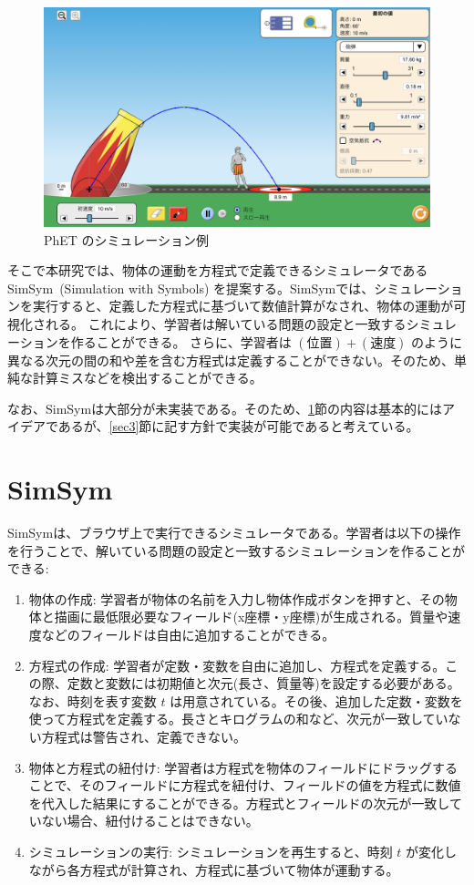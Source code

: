 \documentclass[11pt, a4paper, oneside, twocolumn, dvipdfmx]{jsarticle}
\newcommand{\simname}{SimSym}
\newcommand{\simnamealt}{Simulation with Symbols}
\begin{document}
\begin{figure}[thb]
  \centering
  \includegraphics*[width=0.9\linewidth]{figure/PhET_example.png}
  \caption{PhET のシミュレーション例} \label{numeral_based}
  \end{figure}

そこで本研究では、物体の運動を方程式で定義できるシミュレータである \simname~(\simnamealt) を提案する。\simname では、シミュレーションを実行すると、定義した方程式に基づいて数値計算がなされ、物体の運動が可視化される。
これにより、学習者は解いている問題の設定と一致するシミュレーションを作ることができる。
さらに、学習者は $(\text{位置}) + (\text{速度})$ のように異なる次元の間の和や差を含む方程式は定義することができない。そのため、単純な計算ミスなどを検出することができる。

なお、\simname は大部分が未実装である。そのため、\ref{sec2}節の内容は基本的にはアイデアであるが、\ref{sec3}節に記す方針で実装が可能であると考えている。

\section{\simname} \label{sec2}

\simname は、ブラウザ上で実行できるシミュレータである。学習者は以下の操作を行うことで、解いている問題の設定と一致するシミュレーションを作ることができる:

\begin{enumerate}
\item 物体の作成: 学習者が物体の名前を入力し物体作成ボタンを押すと、その物体と描画に最低限必要なフィールド(x座標・y座標)が生成される。質量や速度などのフィールドは自由に追加することができる。
\item 方程式の作成: 学習者が定数・変数を自由に追加し、方程式を定義する。この際、定数と変数には初期値と次元(長さ、質量等)を設定する必要がある。なお、時刻を表す変数 $t$ は用意されている。その後、追加した定数・変数を使って方程式を定義する。長さとキログラムの和など、次元が一致していない方程式は警告され、定義できない。
\item 物体と方程式の紐付け: 学習者は方程式を物体のフィールドにドラッグすることで、そのフィールドに方程式を紐付け、フィールドの値を方程式に数値を代入した結果にすることができる。方程式とフィールドの次元が一致していない場合、紐付けることはできない。
\item シミュレーションの実行: シミュレーションを再生すると、時刻 $t$ が変化しながら各方程式が計算され、方程式に基づいて物体が運動する。
\end{enumerate}
\end{document}
